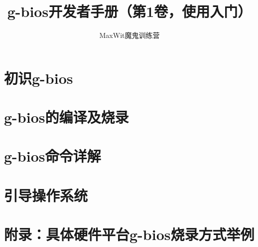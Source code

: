 \documentclass[a4paper,11pt,oneside]{book}
\title{g-bios开发者手册（第1卷，使用入门）}
\author{MaxWit魔鬼训练营}
\begin{document}
\maketitle

\frontmatter
\tableofcontents

\mainmatter

\chapter{初识g-bios}


\chapter{g-bios的编译及烧录}




\chapter{g-bios命令详解}


\chapter{引导操作系统}


\chapter{附录：具体硬件平台g-bios烧录方式举例}

\end{document}
